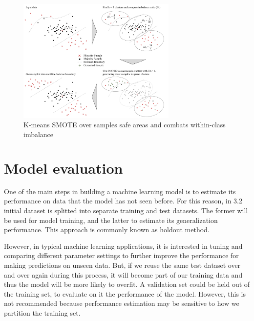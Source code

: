 \documentclass{article}
\begin{document}
\begin{figure}[H]
\centering
\includegraphics[width=0.7\textwidth]{KMeansSMOTE.png}
\caption{K-means SMOTE over samples safe areas and combats within-class imbalance }
\end{figure}


\newpage
\section{Model evaluation}

One of the main steps in building a machine learning model is to estimate its performance on data that the model has not seen before. For this reason, in 3.2 initial dataset is splitted into separate training and test datasets. The former will be used for model training, and the latter to estimate its generalization performance. This approach is commonly known as holdout method.

However, in typical machine learning applications, it is interested in tuning and comparing different parameter settings to further improve the performance for making predictions on unseen data. But, if we reuse the same test dataset over and over again during this process, it will become part of our training data and thus the model will be more likely to overfit. A validation set could be held out of the training set, to evaluate on it the performance of the model. However, this is not recommended because performance estimation may be sensitive to how we partition the training set. 
\end{document}
